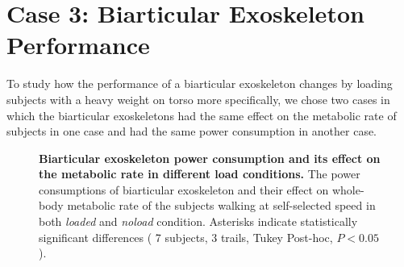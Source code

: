 \documentclass[10pt,letterpaper]{article}
\begin{document}
\section*{Case 3: Biarticular Exoskeleton Performance}
To study how the performance of a biarticular exoskeleton changes by loading subjects with a heavy weight on torso more specifically, we chose two cases in which the biarticular exoskeletons had the same effect on the metabolic rate of subjects in one case and had the same power consumption in another case.\\ 
\begin{figure}[th!]
	\centering
	\hfil
	\vspace{2mm}
	\caption{\small{\textbf{Biarticular exoskeleton power consumption and its effect on the metabolic rate in different load conditions.} The power consumptions of biarticular exoskeleton and their effect on whole-body metabolic rate of the subjects walking at self-selected speed in both {\it loaded} and {\it noload} condition. Asterisks indicate statistically significant differences ( 7 subjects, 3 trails, Tukey Post-hoc, $P < 0.05$).}}
	\label{Fig_Case03_Energy_Plot}
\end{figure}
\end{document}
